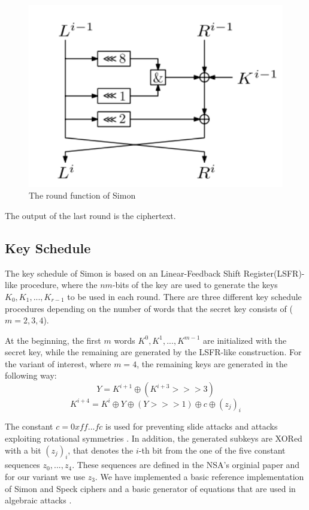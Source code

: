 \begin{figure}[!h]
	\vspace{-0.2cm}
	\centering
	\includegraphics[width=120mm]{./pics/SIMONroundfn-eps-converted-to.pdf}
	\caption{The round function of Simon}
	\label{fig:SIMONroundfn}
	\vspace{-0.1cm}
\end{figure}


The output of the last round is the ciphertext.
\subsection{Key Schedule}
The key schedule of Simon is based on an Linear-Feedback Shift Register(LSFR)-like procedure, where the $nm$-bits of the key are used to generate the keys $K_0,K_1,...,K_{r-1}$ to be used in each round. There are three different key schedule procedures depending on the number of words that the secret key consists of ($m=2,3,4$).

At the beginning, the first $m$ words $K^0,K^1,...,K^{m-1}$ are initialized with the secret key, while the remaining are generated by the LSFR-like construction. For the variant of  interest, where $m=4$, the remaining keys are generated in the following way:
\begin{equation}
Y=K^{i+1}\oplus (K^{i+3}>>>3)
\end{equation}
\begin{equation}
K^{i+4}=K^i\oplus Y \oplus (Y>>>1)\oplus c\oplus (z_j)_i
\end{equation}

The constant $c=0xff...fc$ is used for preventing slide attacks and attacks exploiting rotational symmetries \cite{NSAciphers}. In addition, the generated subkeys are XORed with a bit $(z_j)_i$, that denotes the $i$-th bit from the one of the five constant sequences $z_0,...,z_4$. These sequences are defined in the NSA's orginial paper \cite{NSAciphers} and for our variant we use $z_3$. We have implemented a basic reference implementation of Simon and Speck ciphers and a basic generator of equations that are used in algebraic attacks \cite{simonref} .

